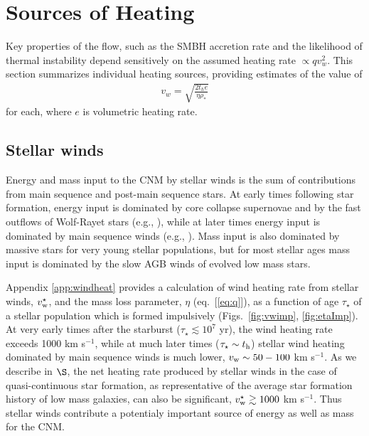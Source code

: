 \documentclass[usenatbib,fleqn]{mn2e}
\newcommand{\rhostar}{\rho_*}
\begin{document}
\section{Sources of Heating}
\label{sec:heating}

Key properties of the flow, such as the SMBH accretion rate and the likelihood of thermal instability depend sensitively on the assumed heating rate $\propto qv_{w}^{2}$.  This section summarizes individual heating sources, providing estimates of the value of
\begin{align}
  v_{w} = \sqrt{\frac{2 t_h e}{\eta \rhostar}}
  \label{eq:vw_eff}
\end{align}
for each, where $e$ is volumetric heating rate.  

\subsection{Stellar winds} 

Energy and mass input to the CNM by stellar winds is the sum of contributions from main sequence and post-main sequence stars.  At early times following star formation, energy input is dominated by core collapse supernovae and by the fast outflows of Wolf-Rayet stars (e.g., \citealt{VossDiehl+:2009a}), while at later times energy input is dominated by main sequence winds (e.g., \citealt{NaimanSoares-Furtado+:2013a}).  Mass input is also dominated by massive stars for very young stellar populations, but for most stellar ages mass input is dominated by the slow AGB winds of evolved low mass stars.  

Appendix \ref{app:windheat} provides a calculation of wind heating rate from stellar winds, $v_{\rm w}^{\star}$, and the mass loss parameter, $\eta$ (eq.~[\ref{eq:q}]), as a function of age $\tau_{\star}$ of a stellar population which is formed impulsively (Figs.~\ref{fig:vwimp}, \ref{fig:etaImp}).  At very early times after the starburst ($\tau_{\star} \lesssim 10^{7}$ yr), the wind heating rate exceeds 1000 km s$^{-1}$, while at much later times ($\tau_{\star} \sim t_{\rm h}$) stellar wind heating dominated by main sequence winds is much lower, $v_{\rm w} \sim 50-100 $ km s$^{-1}$.  As we describe in $\S$, the net heating rate produced by stellar winds in the case of quasi-continuous star formation, as representative of the average star formation history of low mass galaxies, can also be significant, $v_{\rm w}^{\star} \gtrsim 1000$ km s$^{-1}$.  Thus stellar winds contribute a potentialy important source of energy as well as mass for the CNM.
\end{document}
